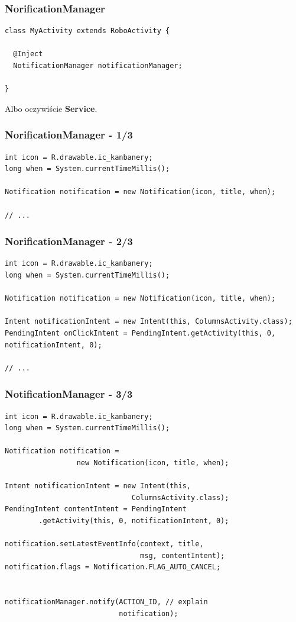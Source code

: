 \begin{frame}[fragile]\frametitle{NorificationManager}
\begin{lstlisting}
class MyActivity extends RoboActivity {
  
  @Inject
  NotificationManager notificationManager;

}
\end{lstlisting}
\pause Albo oczywiście \textbf{Service}.
\end{frame}


\begin{frame}[fragile]\frametitle{NorificationManager - 1/3}
\begin{lstlisting}
int icon = R.drawable.ic_kanbanery;
long when = System.currentTimeMillis();

Notification notification = new Notification(icon, title, when);

// ...
\end{lstlisting}
\end{frame}


\begin{frame}[fragile]\frametitle{NorificationManager - 2/3}
\begin{lstlisting}
int icon = R.drawable.ic_kanbanery;
long when = System.currentTimeMillis();

Notification notification = new Notification(icon, title, when);

Intent notificationIntent = new Intent(this, ColumnsActivity.class);
PendingIntent onClickIntent = PendingIntent.getActivity(this, 0, notificationIntent, 0);

// ...
\end{lstlisting}
\end{frame}

\begin{frame}[fragile]\frametitle{NotificationManager - 3/3}
\begin{lstlisting}
int icon = R.drawable.ic_kanbanery;
long when = System.currentTimeMillis();

Notification notification = 
                 new Notification(icon, title, when);

Intent notificationIntent = new Intent(this, 
                              ColumnsActivity.class);
PendingIntent contentIntent = PendingIntent
        .getActivity(this, 0, notificationIntent, 0);

notification.setLatestEventInfo(context, title, 
                                msg, contentIntent);
notification.flags = Notification.FLAG_AUTO_CANCEL;


notificationManager.notify(ACTION_ID, // explain 
                           notification);
\end{lstlisting}
\end{frame}


